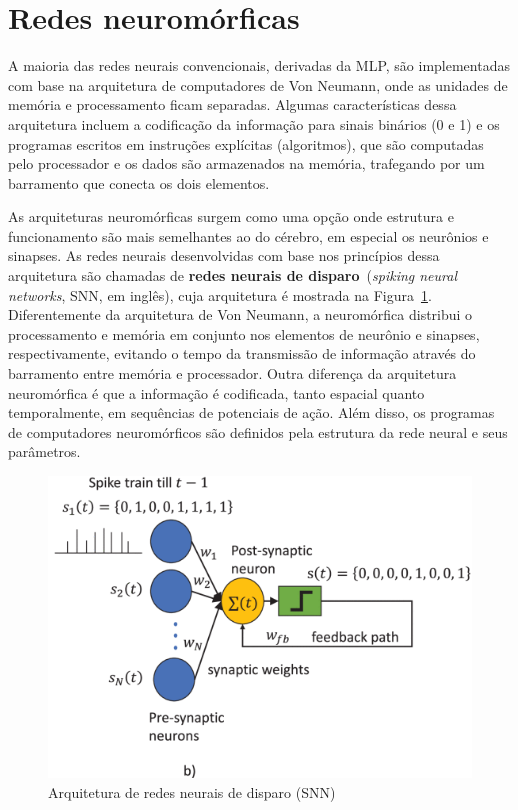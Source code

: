 \section{Redes neuromórficas}\label{sec:redesneuromorficas}
A maioria das redes neurais convencionais, derivadas da MLP, são implementadas com base na arquitetura de computadores de Von Neumann, onde as unidades de memória e processamento ficam separadas.
Algumas características dessa arquitetura incluem a codificação da informação para sinais binários (0 e 1) e os programas escritos em instruções explícitas (algoritmos), que são computadas pelo processador e os dados são armazenados na memória, trafegando por um barramento que conecta os dois elementos.

As arquiteturas neuromórficas surgem como uma opção onde estrutura e funcionamento são mais semelhantes ao do cérebro, em especial os neurônios e sinapses.
As redes neurais desenvolvidas com base nos princípios dessa arquitetura são chamadas de \textbf{redes neurais de disparo}~(\textit{spiking neural networks}, SNN, em inglês), cuja arquitetura é mostrada na Figura~\ref{fig:snn}. Diferentemente da arquitetura de Von Neumann, a neuromórfica distribui o processamento e memória em conjunto nos elementos de neurônio e sinapses, respectivamente, evitando o tempo da transmissão de informação através do barramento entre memória e processador.
Outra diferença da arquitetura neuromórfica é que a informação é codificada, tanto espacial quanto temporalmente, em sequências de potenciais de ação.
Além disso, os programas de computadores neuromórficos são definidos pela estrutura da rede neural e seus parâmetros.
\begin{figure}[tb]
	\centering
	\caption[Arquitetura de redes neurais de disparo (SNN)]{Arquitetura de redes neurais de disparo (SNN)}
	\label{fig:snn}
	\includegraphics[width=0.7\linewidth]{figs/snn}
\end{figure}


